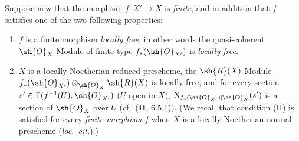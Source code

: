 \begin{env}[21.5.3]
\label{IV.21.5.3}
Suppose now that the morphism $f:X'\to X$ is \emph{finite}, and in addition that $f$ satisfies one of the two following properties:
\begin{enumerate}[label=\Roman*)]
  \item $f$ is a finite morphism \emph{locally free}, in other words  the quasi-coherent $\sh{O}_X$-Module of finite type $f_*(\sh{O}_{X'})$ is \emph{locally free}.
  \item $X$ is a locally Noetherian reduced prescheme, the $\sh{R}(X)$-Module $f_*(\sh{O}_{X'})\otimes_{\sh{O}_X}\sh{R}(X)$ is locally free, and for every section $s'\in\Gamma(f^{-1}(U),\sh{O}_{X'})$ ($U$ open
in $X$), $\mathrm{N}_{f_*(\sh{O}_{X'})|\sh{O}_X}(s')$ is a section of $\sh{O}_X$ over $U$ (cf.\ (\textbf{II}, 6.5.1)).
  (We recall that condition (II) is satisfied for every \emph{finite morphism} $f$ when $X$ is a locally Noetherian normal prescheme (\emph{loc.\ cit.}).)
\end{enumerate}


\end{env}
